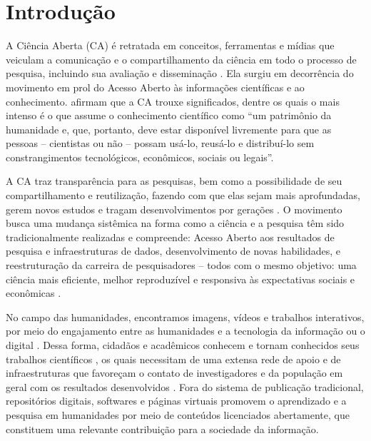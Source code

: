 \documentclass[portuguese]{textolivre}
\begin{document}
\begin{polyabstract}
\begin{english}
\begin{abstract}
\end{abstract}
\end{english}
\end{polyabstract}

\section{Introdução}
A Ciência Aberta (CA) é retratada em conceitos, ferramentas e mídias que veiculam a comunicação e o compartilhamento da ciência em todo o processo de pesquisa, incluindo sua avaliação e disseminação \cite{picarra2016}.  Ela surgiu em decorrência do movimento em prol do Acesso Aberto às informações científicas e ao conhecimento. \textcite[p.~77]{saya2014} afirmam que a CA trouxe significados, dentre os quais o mais intenso é o que assume o conhecimento científico como “um patrimônio da humanidade e, que, portanto, deve estar disponível livremente para que as pessoas – cientistas ou não – possam usá-lo, reusá-lo e distribuí-lo sem constrangimentos tecnológicos, econômicos, sociais ou legais”.

A CA traz transparência para as pesquisas, bem como a possibilidade de seu compartilhamento e reutilização, fazendo com que elas sejam mais aprofundadas, gerem novos estudos e tragam desenvolvimentos por gerações \cite{pinheiro2019}. O movimento busca uma mudança sistêmica na forma como a ciência e a pesquisa têm sido tradicionalmente realizadas e compreende: Acesso Aberto aos resultados de pesquisa e infraestruturas de dados, desenvolvimento de novas habilidades, e reestruturação da carreira de pesquisadores – todos com o mesmo objetivo: uma ciência mais eficiente, melhor reproduzível e responsiva às expectativas sociais e econômicas \cite{european_commission2016}.

No campo das humanidades, encontramos imagens, vídeos e trabalhos interativos, por meio do engajamento entre as humanidades e a tecnologia da informação ou o digital \cite{svensson2010}. Dessa forma, cidadãos e acadêmicos conhecem e tornam conhecidos seus trabalhos científicos \cite{kamal2023}, os quais necessitam de uma extensa rede de apoio e de infraestruturas que favoreçam o contato de investigadores e da população em geral com os resultados desenvolvidos \cite{edmond2020}. Fora do sistema de publicação tradicional, repositórios digitais, softwares e páginas virtuais promovem o aprendizado e a pesquisa em humanidades por meio de conteúdos licenciados abertamente, que constituem uma relevante contribuição para a sociedade da informação.
\end{document}

